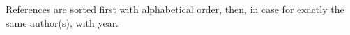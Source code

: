 \starttitle [title={References}]

References are sorted first with alphabetical order, then, in case for exactly the same author(s), with year.
\bigskip
\placelistofpublications [method=dataset]

\stoptitle

